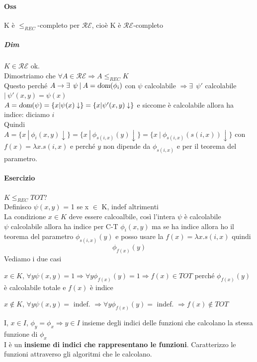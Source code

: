 \documentclass[10pt]{book}
\begin{document}
\paragraph{Oss} K è $\leq_{REC}$-completo per $\mathscr{RE}$, cioè K è $\mathscr{RE}$-completo
\subparagraph{Dim} $K \in \mathscr{RE}$ ok.\\
Dimostriamo che $\forall A \in \mathscr{RE} \Rightarrow A \leq_{REC} K$\\
Questo perché $A \rightarrow \exists\:\:\psi\: |\: A = \textsl{dom}(\phi_i)$ con $\psi$ calcolabile $\Rightarrow \exists\:\:\psi'$ calcolabile $|\: \psi'(x, y) = \psi(x)$\\
$A = \textsl{dom}(\psi) = \{x | \psi(x)\downarrow\} = \{x | \psi'(x, y)\downarrow\}$ e siccome è calcolabile allora ha indice: diciamo $i$\\
Quindi $A = \{x \: |\: \phi_i(x, y)\downarrow\} = \{x\: |\: \phi_{s(i, x)}(y)\downarrow\} = \{x\: |\: \phi_{s(i, x)}(s(i, x))\downarrow\}$ con $f(x) = \lambda x.s(i, x)$ e perché $y$ non dipende da $\phi_{s(i, x)}$ e per il teorema del parametro.
\paragraph{Esercizio} $K \leq_{REC} TOT$?\\
Definisco $\psi(x, y)$ = 1 se x $\in$ K, indef altrimenti\\
La condizione $x \in K$ deve essere calcoalbile, così l'intera $\psi$ è calcolabile\\
$\psi$ calcolabile allora ha indice per C-T $\phi_i(x, y)$ ma se ha indice allora ho il teorema del parametro $\phi_{s(i, x)}(y)$ e posso usare la $f(x) = \lambda x.s(i, x)$ quindi
$$\phi_{f(x)}(y)$$
Vediamo i due casi
\begin{list}{}{}
	\item $x \in K$, $\forall y \psi(x, y) = 1 \Rightarrow \forall y \phi_{f(x)}(y) = 1 \Rightarrow f(x) \in TOT$ perché $\phi_{f(x)}(y)$ è calcolabile totale e $f(x)$ è indice
	\item $x \not\in K$, $\forall y \psi(x, y) =$ indef. $\Rightarrow \forall y \phi_{f(x)}(y) =$ indef. $\Rightarrow f(x) \not\in TOT$
\end{list}
I, $x \in I$, $\phi_y = \phi_x \Rightarrow y \in I$ insieme degli indici delle funzioni che calcolano la stessa funzione di $\phi_x$\\
I è un \textbf{insieme di indici che rappresentano le funzioni}. Caratterizzo le funzioni attraverso gli algoritmi che le calcolano.
\end{document}
